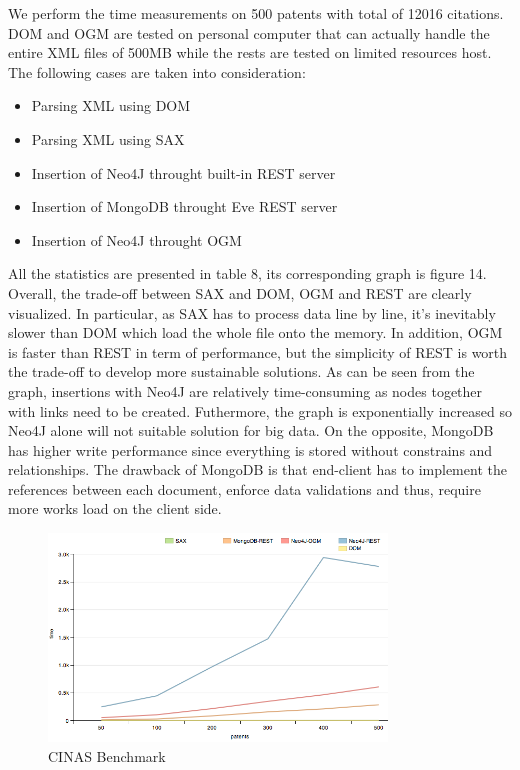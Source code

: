 \documentclass{sig-alternate}
\begin{document}
{ We perform the time measurements on 500 patents with total of 12016 citations. DOM and OGM are tested on personal computer that can actually handle the entire XML files of 500MB while the rests are tested on limited resources host. The following cases are taken into consideration:
 \begin{itemize}
 \item  Parsing XML using DOM
 \item Parsing XML using SAX
 \item Insertion of Neo4J throught built-in REST server
 \item Insertion of MongoDB throught Eve REST server
 \item Insertion of Neo4J throught OGM
\end{itemize}
 
All the statistics are presented in table 8, its corresponding graph is figure 14. Overall, the trade-off between SAX and DOM, OGM and REST are clearly visualized. In particular, as SAX has to process data line by line, it's inevitably slower than DOM which load the whole file onto the memory. In addition, OGM is faster than REST in term of performance, but the simplicity of REST is worth the trade-off to develop more sustainable solutions. As can be seen from the graph, insertions with Neo4J are relatively time-consuming as nodes together with links need to be created. Futhermore, the graph is exponentially increased so Neo4J alone will not suitable solution for big data. On the opposite, MongoDB has higher write performance since everything is stored without constrains and relationships. The drawback of MongoDB is that end-client has to implement the references between each document, enforce data validations and thus, require more works load on the client side. 
 
 
 \begin{figure}[!htb]
\centering
\includegraphics[width=90mm]{line.png}
\caption{CINAS Benchmark}
\end{figure}

}
\end{document}
